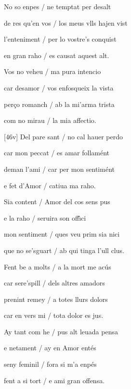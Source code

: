 \documentclass[12pt]{article}
\begin{document}
\begin{estrofa}

 No so enpes / ne temptat per desalt

 de res qu'en vos / los meus vlls hajen vist

 l'enteniment / per lo vostre's conquist

 en gran raho / es causat aquest alt.

 Vos no veheu / ma pura intencio

 car desamor / vos enfosqueix la vista

 per\c{c}o romanch / ab la mi'arma trista

 com no mirau / la mia affectio.

\end{estrofa}



\begin{estrofa}

 [46v] Del pare sant / no cal hauer perdo

 car mon peccat / es amar follam\'{e}nt

 deman l'ami / car per mon sentim\'{e}nt

 e fet d'Amor / catiua ma raho.

 Sia content / Amor del cos sens pus

 e la raho / seruira son off\^{\i}ci

 mon sentiment / ques veu prim sia nici

 que no se'sguart / ab qui tinga l'ull clus.

\end{estrofa}



\begin{estrofa}

 Fent be a molts / a la mort me ac\'{u}s

 car sere'spill / dels altres amadors

 prenint remey / a totes llurs dolors

 car en vers mi / tota dolor es jus.

 Ay tant com he / pus alt leuada pensa

 e netament / ay en Amor ent\'{e}s

 seny feminil / fora si m'a enp\'{e}s

 fent a si tort / e ami gran offensa.

\end{estrofa}
\end{document}
